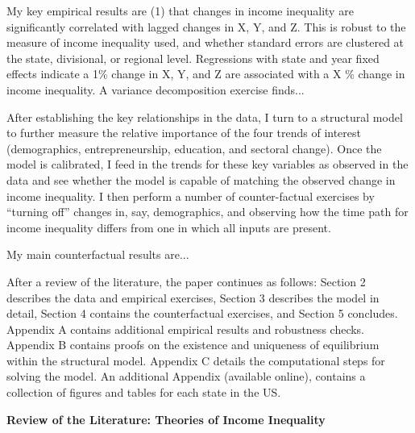 \documentclass[11pt]{article}
\theoremstyle{definition}
\numberwithin{equation}{section}
\begin{document}
My key empirical results are (1) that changes in income inequality are significantly correlated with lagged changes in X, Y, and Z. This is robust to the measure of income inequality used, and whether standard errors are clustered at the state, divisional, or regional level. Regressions with state and year fixed effects indicate a 1\% change in X, Y, and Z are associated with a X \% change in income inequality. A variance decomposition exercise finds...

After establishing the key relationships in the data, I turn to a structural model to further measure the relative importance of the four trends of interest (demographics, entrepreneurship, education, and sectoral change). Once the model is calibrated, I feed in the trends for these key variables as observed in the data and see whether the model is capable of matching the observed change in income inequality. I then perform a number of counter-factual exercises by ``turning off'' changes in, say, demographics, and observing how the time path for income inequality differs from one in which all inputs are present.

My main counterfactual results are...

After a review of the literature, the paper continues as follows: Section 2 describes the data and empirical exercises, Section 3 describes the model in detail, Section 4 contains the counterfactual exercises, and Section 5 concludes. Appendix A contains additional empirical results and robustness checks. Appendix B contains proofs on the existence and uniqueness of equilibrium within the structural model. Appendix C details the computational steps for solving the model. An additional Appendix (available online), contains a collection of figures and tables for each state in the US.


{\bf Review of the Literature: Theories of Income Inequality}
 
\end{document}
